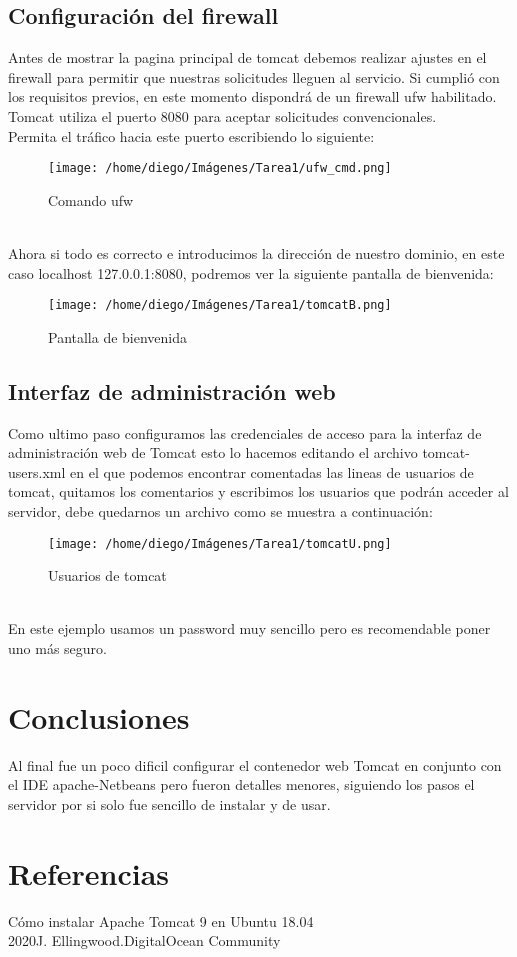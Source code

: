 \documentclass{article}
\begin{document}
		\subsection{Configuración del firewall}
		Antes de mostrar la pagina principal de tomcat debemos realizar ajustes en el firewall para permitir que nuestras solicitudes lleguen al servicio. Si cumplió con los requisitos previos, en este momento dispondrá de un firewall ufw habilitado. Tomcat utiliza el puerto 8080 para aceptar solicitudes convencionales. \\
		Permita el tráfico hacia este puerto escribiendo lo siguiente:
		\begin{figure}[h]
			\centering
			\texttt{[image: /home/diego/Imágenes/Tarea1/ufw\_cmd.png]}
			\caption{Comando ufw}
		\end{figure}
		\\Ahora si todo es correcto e introducimos la dirección de nuestro dominio, en este caso localhost 127.0.0.1:8080, podremos ver la siguiente pantalla de bienvenida:
		\begin{figure}[h]
			\centering
			\texttt{[image: /home/diego/Imágenes/Tarea1/tomcatB.png]}
			\caption{Pantalla de bienvenida}
		\end{figure}
		\newpage
		\subsection{Interfaz de administración web}
		Como ultimo paso configuramos las credenciales de acceso para la interfaz de administración web de Tomcat esto lo hacemos editando el archivo tomcat-users.xml en el que podemos encontrar comentadas las lineas de usuarios de tomcat, quitamos los comentarios y escribimos los usuarios que podrán acceder al servidor, debe quedarnos un archivo como se muestra a continuación:
		\begin{figure}[h]
			\centering
			\texttt{[image: /home/diego/Imágenes/Tarea1/tomcatU.png]}
			\caption{Usuarios de tomcat}
		\end{figure}
		\\En este ejemplo usamos un password muy sencillo pero es recomendable poner uno más seguro.
	\section{Conclusiones}
	Al final fue un poco dificil configurar el contenedor web Tomcat en conjunto con el IDE apache-Netbeans pero fueron detalles menores, siguiendo los pasos el servidor por si solo fue sencillo de instalar y de usar.
	\section{Referencias}
	Cómo instalar Apache Tomcat 9 en Ubuntu 18.04\\
	2020J. Ellingwood.DigitalOcean Community
\end{document}
